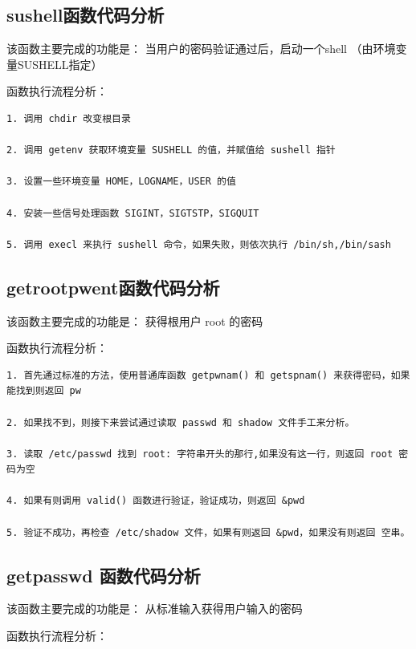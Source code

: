 \subsection{sushell函数代码分析}

该函数主要完成的功能是： 当用户的密码验证通过后，启动一个shell
（由环境变量SUSHELL指定）

函数执行流程分析：

{\begin{shaded}\begin{verbatim}
1. 调用 chdir 改变根目录

2. 调用 getenv 获取环境变量 SUSHELL 的值，并赋值给 sushell 指针

3. 设置一些环境变量 HOME，LOGNAME，USER 的值

4. 安装一些信号处理函数 SIGINT，SIGTSTP，SIGQUIT

5. 调用 execl 来执行 sushell 命令，如果失败，则依次执行 /bin/sh,/bin/sash
\end{verbatim}\end{shaded}}
\subsection{getrootpwent函数代码分析}

该函数主要完成的功能是： 获得根用户 root 的密码

函数执行流程分析：

{\begin{shaded}\begin{verbatim}
1. 首先通过标准的方法，使用普通库函数 getpwnam() 和 getspnam() 来获得密码，如果能找到则返回 pw

2. 如果找不到，则接下来尝试通过读取 passwd 和 shadow 文件手工来分析。

3. 读取 /etc/passwd 找到 root: 字符串开头的那行,如果没有这一行，则返回 root 密码为空

4. 如果有则调用 valid() 函数进行验证，验证成功，则返回 &pwd

5. 验证不成功，再检查 /etc/shadow 文件，如果有则返回 &pwd，如果没有则返回 空串。
\end{verbatim}\end{shaded}}
\subsection{getpasswd 函数代码分析}

该函数主要完成的功能是： 从标准输入获得用户输入的密码

函数执行流程分析：

